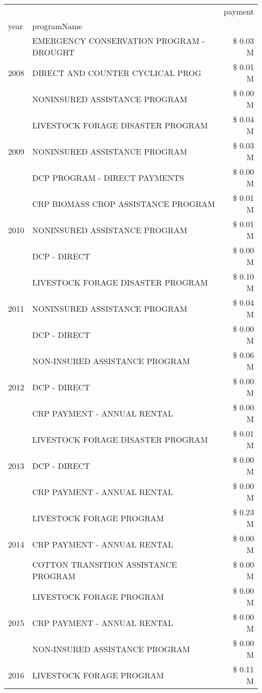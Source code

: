 \begin{tabular}{llr}
\toprule
 &  & payment \\
year & programName &  \\
\midrule
\multirow[t]{3}{*}{2008} & EMERGENCY CONSERVATION PROGRAM - DROUGHT & \$ 0.03 M \\
 & DIRECT AND COUNTER CYCLICAL PROG & \$ 0.01 M \\
 & NONINSURED ASSISTANCE PROGRAM & \$ 0.00 M \\
\cline{1-3}
\multirow[t]{3}{*}{2009} & LIVESTOCK FORAGE DISASTER  PROGRAM & \$ 0.04 M \\
 & NONINSURED ASSISTANCE PROGRAM & \$ 0.03 M \\
 & DCP PROGRAM - DIRECT PAYMENTS & \$ 0.00 M \\
\cline{1-3}
\multirow[t]{3}{*}{2010} & CRP BIOMASS CROP ASSISTANCE PROGRAM & \$ 0.01 M \\
 & NONINSURED ASSISTANCE PROGRAM & \$ 0.01 M \\
 & DCP - DIRECT & \$ 0.00 M \\
\cline{1-3}
\multirow[t]{3}{*}{2011} & LIVESTOCK FORAGE DISASTER PROGRAM & \$ 0.10 M \\
 & NONINSURED ASSISTANCE PROGRAM & \$ 0.04 M \\
 & DCP - DIRECT & \$ 0.00 M \\
\cline{1-3}
\multirow[t]{3}{*}{2012} & NON-INSURED ASSISTANCE PROGRAM & \$ 0.06 M \\
 & DCP - DIRECT & \$ 0.00 M \\
 & CRP PAYMENT - ANNUAL RENTAL & \$ 0.00 M \\
\cline{1-3}
\multirow[t]{3}{*}{2013} & LIVESTOCK FORAGE DISASTER PROGRAM & \$ 0.01 M \\
 & DCP - DIRECT & \$ 0.00 M \\
 & CRP PAYMENT - ANNUAL RENTAL & \$ 0.00 M \\
\cline{1-3}
\multirow[t]{3}{*}{2014} & LIVESTOCK FORAGE PROGRAM & \$ 0.23 M \\
 & CRP PAYMENT - ANNUAL RENTAL & \$ 0.00 M \\
 & COTTON TRANSITION ASSISTANCE PROGRAM & \$ 0.00 M \\
\cline{1-3}
\multirow[t]{3}{*}{2015} & LIVESTOCK FORAGE PROGRAM & \$ 0.00 M \\
 & CRP PAYMENT - ANNUAL RENTAL & \$ 0.00 M \\
 & NON-INSURED ASSISTANCE PROGRAM & \$ 0.00 M \\
\cline{1-3}
\multirow[t]{3}{*}{2016} & LIVESTOCK FORAGE PROGRAM & \$ 0.11 M \\

\end{tabular}
